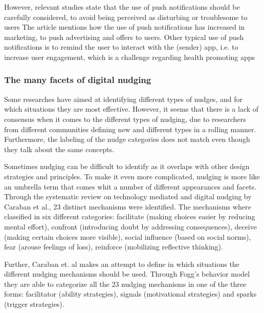 However, relevant studies state that the use of push notifications should be carefully considered, to avoid being perceived as disturbing or troublesome to users \cite{warren_push_2014}
The article mentions how the use of push notifications has increased in marketing, to push advertising and offers to users. Other typical use of push notifications is to remind the user to interact with the (sender) app, i.e. to increase user engagement, which is a challenge regarding health promoting apps \cite{bidargaddi_prompt_2018}

\subsubsection{The many facets of digital nudging}
Some researches have aimed at identifying different types of nudges, and for which situations they are most effective. However, it seems that there is a lack of consensus when it comes to the different types of nudging, due to researchers from different communities defining new and different types in a rolling manner. Furthermore, the labeling of the nudge categories does not match even though they talk about the same concepts. 

Sometimes nudging can be difficult to identify as it overlaps with other design strategies and principles. To make it even more complicated, nudging is more like an umbrella term that comes whit a number of different appearances and facets. Through the systematic review on technology mediated and digital nudging by Caraban et al.\cite{caraban_23_2019}, 23 distinct mechanisms were identified. The mechanisms where classified in six different categories: facilitate (making choices easier by reducing mental effort), confront (introducing doubt by addressing consequences), deceive (making certain choices more visible), social influence (based on social norms), fear (arouse feelings of loss), reinforce (mobilizing reflective thinking). 

Further, Caraban et. al \cite{caraban_23_2019} makes an attempt to define in which situations the different nudging mechanisms should be used. Through Fogg's behavior model they are able to categorize all the 23 nudging mechanisms in one of the three forms: facilitator (ability strategies), signals (motivational strategies) and sparks (trigger strategies).

